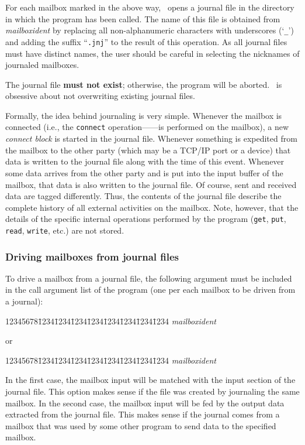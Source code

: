 For each mailbox marked in the above way, \smurph\ opens a journal file
in the directory in which the program has been called.
The name of this file is obtained from {\em mailboxident\/} by replacing
all non-alphanumeric characters with underscores (`{\tt \_}') and adding
the suffix ``{\tt .jnj}'' to the result of this operation.
As all journal files must have distinct names, the user should be careful
in selecting the nicknames of journaled mailboxes.

The journal file {\bf must not exist}; otherwise,
the program will be aborted.
\smurph\ is obsessive about not overwriting existing journal files.

Formally, the idea behind journaling is very simple.
Whenever the mailbox is connected (i.e., the {\tt connect}
operation------is performed on the mailbox), a new
{\em connect block\/} is started in the journal file.
Whenever something is expedited from the mailbox to the other party
(which may be a TCP/IP port or a device) that data is written
to the journal file along with the time of this event.
Whenever some data arrives from the other party and is put into the
input buffer of the mailbox, that data is also written to the journal
file.
Of course, sent and received data are tagged differently.
Thus, the contents of the journal file describe the complete history of
all external activities on the mailbox.
Note, however, that the details of the specific internal
operations performed by the
program ({\tt get}, {\tt put}, {\tt read}, {\tt write}, etc.) are not
stored.

\subsubsection{Driving mailboxes from journal files}
\label{rm_mb_ju_dj}

To drive a mailbox from a journal file, the following argument must be
included in the call argument list of the program (one per each mailbox
to be driven from a journal):
{\tt\begin{tabbing}
12345678\=1234\=1234\=1234\=1234\=1234\=1234\=1234\=1234\kill
{} {\em mailboxident\/}
\end{tabbing}}
or
{\tt\begin{tabbing}
12345678\=1234\=1234\=1234\=1234\=1234\=1234\=1234\=1234\kill
{} {\em mailboxident\/}
\end{tabbing}}

In the first case, the mailbox input will be matched with the input section
of the journal file.
This option makes sense if the file was created by
journaling the same mailbox.
In the second case, the mailbox input will be fed by the output data
extracted from the journal file.
This makes sense if the journal comes from a mailbox that was used by
some other program to send data to the specified mailbox.

